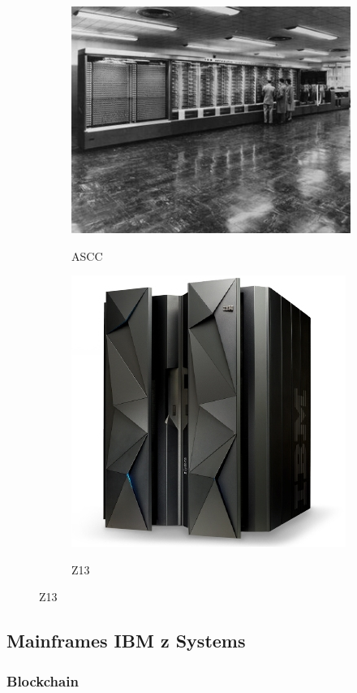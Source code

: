 \documentclass[paper=a4, fontsize=10pt]{scrartcl} %
\numberwithin{equation}{section} %
\numberwithin{figure}{section} %
\numberwithin{table}{section} %
\begin{document}
\begin{figure}[H]
	\centering
	\begin{subfigure}{.5\textwidth}
		\centering
		\href{https://www-03.ibm.com/ibm/history/exhibits/markI/markI_intro.html}{		\includegraphics[width=.65\linewidth]{./Imagenes/ascc.jpg}}
		\caption{ASCC}
		\label{fig:ascc}
	\end{subfigure}%
	\begin{subfigure}{.5\textwidth}
		\centering
		\href{https://www-03.ibm.com/systems/z/hardware/z13.html}{\includegraphics[width=.65\linewidth]{./Imagenes/z13.jpg}}
		\caption{Z13}
		\label{fig:z13}
	\end{subfigure}
\end{figure}



\subsection{Mainframes IBM z Systems}

\subsubsection{Blockchain}
\end{document}

